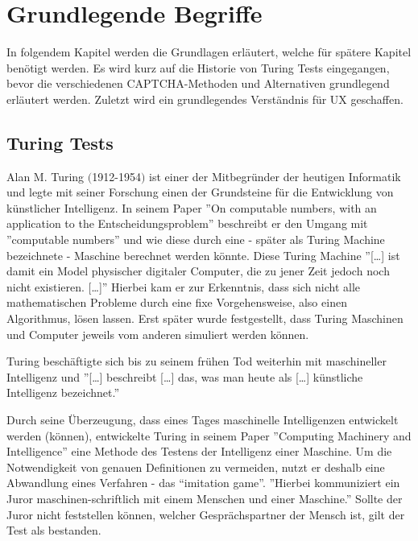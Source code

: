 \chapter{Grundlegende Begriffe}
\label{ch:basics}
In folgendem Kapitel werden die Grundlagen erläutert, welche für spätere Kapitel benötigt werden. 
Es wird kurz auf die Historie von Turing Tests eingegangen, 
bevor die verschiedenen CAPTCHA-Methoden und Alternativen grundlegend erläutert werden. 
Zuletzt wird ein grundlegendes Verständnis für UX geschaffen.

\section{Turing Tests}
\label{ch:basics:turing}
Alan M. Turing $($1912-1954$)$ ist einer der Mitbegründer der heutigen Informatik 
und legte mit seiner Forschung einen der Grundsteine für die Entwicklung von künstlicher Intelligenz. 
In seinem Paper ''On computable numbers, with an application to the Entscheidungsproblem'' \cite{turing} 
beschreibt er den Umgang mit ''computable numbers'' und wie diese durch eine - später als Turing Machine bezeichnete - Maschine berechnet werden könnte.
Diese Turing Machine ''[\dots] ist damit ein Model physischer digitaler Computer, die zu jener Zeit jedoch noch nicht existieren. [\dots]'' \cite[p.4]{pallay2020turing}
Hierbei kam er zur Erkenntnis, dass sich nicht alle mathematischen Probleme durch eine fixe Vorgehensweise, also einen Algorithmus, lösen lassen. 
Erst später wurde festgestellt, dass Turing Maschinen und Computer jeweils vom anderen simuliert werden können. \cite[p.647]{geniusofturing} \cite[p.4]{pallay2020turing} %

Turing beschäftigte sich bis zu seinem frühen Tod weiterhin mit maschineller Intelligenz 
und ''[\dots] beschreibt [\dots] das, was man heute als [\dots] künstliche Intelligenz bezeichnet.'' \cite[p.10]{pallay2020turing}

Durch seine Überzeugung, dass eines Tages maschinelle Intelligenzen entwickelt werden (können), 
entwickelte Turing in seinem Paper ''Computing Machinery and Intelligence'' \cite[p.23ff]{turing2009computing} 
eine Methode des Testens der Intelligenz einer Maschine. 
Um die Notwendigkeit von genauen Definitionen zu vermeiden, nutzt er deshalb eine Abwandlung eines Verfahren - das ``imitation game''. 
''Hierbei kommuniziert ein Juror maschinen-schriftlich mit einem Menschen und einer Maschine.'' \cite[p.12]{pallay2020turing}
Sollte der Juror nicht feststellen können, welcher Gesprächspartner der Mensch ist, gilt der Test als bestanden. \cite[p.11ff]{pallay2020turing}

